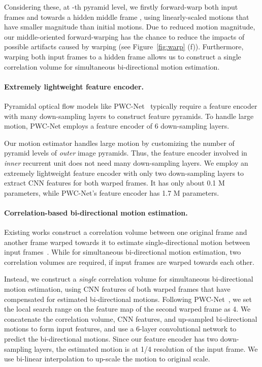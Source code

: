 \documentclass[10pt,twocolumn,letterpaper]{article}
\begin{document}
Considering these, at -th pyramid level, we firstly forward-warp both input
frames  and  towards a hidden middle frame , using
linearly-scaled motions that have smaller magnitude than initial motions. Due to
reduced motion magnitude, our middle-oriented forward-warping has the chance to
reduce the impacts of possible artifacts caused by warping (see
Figure~\ref{fig:warp} (f)).  Furthermore, warping both input frames to a hidden
frame allows us to construct a single correlation volume for simultaneous
bi-directional motion estimation.


\paragraph{Extremely lightweight feature encoder.} Pyramidal optical flow models
like PWC-Net~\cite{sun2018pwc} typically require a feature encoder with many
down-sampling layers to construct feature pyramids. To handle large motion,
PWC-Net employs a feature encoder of 6 down-sampling layers.


Our motion estimator handles large motion by customizing the number of pyramid
levels of \textit{outer} image pyramids. Thus, the feature encoder involved
in \textit{inner} recurrent unit does not need many down-sampling layers. We
employ an extremely lightweight feature encoder with only two down-sampling
layers to extract CNN features for both warped frames. It has
only about 0.1 M parameters, while PWC-Net's feature encoder has 1.7 M
parameters.



\paragraph{Correlation-based bi-directional motion estimation.} Existing works
construct a correlation volume between one original frame and another frame
warped towards it to estimate single-directional motion between input
frames~\cite{sun2018pwc,lee2022enhanced}. While for simultaneous bi-directional
motion estimation, two correlation volumes are required, if input frames are
warped towards each other.


Instead, we construct a \textit{single} correlation volume for simultaneous
bi-directional motion estimation, using CNN features of both warped frames that
have compensated for estimated bi-directional motions. Following
PWC-Net~\cite{sun2018pwc}, we set the local search range on the feature map of
the second warped frame as 4.  We concatenate the correlation volume, CNN
features, and up-sampled bi-directional motions to form input features, and
use a 6-layer convolutional network to predict the bi-directional motions. Since
our feature encoder has two down-sampling layers, the estimated motion is at 1/4
resolution of the input frame. We use bi-linear interpolation to up-scale the
motion to original scale.
\end{document}
